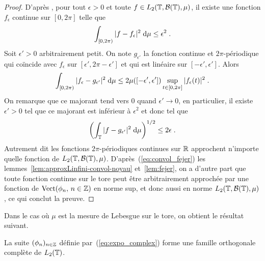 \begin{proof}
  D'apr\`{e}s \cite[proposition~8 du chapitre~6, page~128]{royden:1988}, pour tout
  $\epsilon>0$ et toute $f\in L_2(\mathbb{T},\mathcal{B}(\mathbb{T}),\mu)$, il existe une
  fonction $f_\epsilon$ continue sur $[0,2\pi]$ telle que
$$
\int_{[0,2\pi)}|f-f_\epsilon|^2\;\mathrm{d}\mu \leq \epsilon^2 \;.
$$
Soit $\epsilon'>0$ arbitrairement petit. On note $g_{\epsilon'}$ la fonction
continue et $2\pi$-p\'{e}riodique qui co\"{i}ncide avec $f_\epsilon$ sur
$[\epsilon',2\pi-\epsilon']$ et qui est lin\'{e}aire sur
$[-\epsilon',\epsilon']$. Alors
$$
\int_{[0,2\pi)}|f_\epsilon-g_{\epsilon'}|^2\;\mathrm{d}\mu \leq
2 \mu([-\epsilon',\epsilon']) \sup_{t\in[0,2\pi]}|f_\epsilon(t)|^2 \;.
$$
On remarque que ce majorant tend vers 0 quand $\epsilon'\to0$, en particulier,
il existe $\epsilon'>0$ tel que ce majorant est inf\'{e}rieur \`{a} $\epsilon^2$ et
donc tel que
$$
\left(\int_{\mathbb{T}}|f-g_{\epsilon'}|^2\;\mathrm{d}\mu\right)^{1/2} \leq 2\epsilon \;.
$$
Autrement dit les fonctions $2\pi$-p\'{e}riodiques continues sur $\mathbb{R}$ approchent
n'importe quelle fonction de $L_2(\mathbb{T},\mathcal{B}(\mathbb{T}),\mu)$.
D'apr\`{e}s~(\ref{eq:convol_fejer}) les lemmes~\ref{lem:approxLinfini-convol-noyau}
et~\ref{lem:fejer}, on a d'autre part que toute fonction continue sur le tore
peut \^{e}tre arbitrairement approch\'{e}e par une fonction de
$\mathrm{Vect}(\phi_n,\,n\in\mathbb{Z})$ en norme sup, et donc aussi en norme
$L_2(\mathbb{T},\mathcal{B}(\mathbb{T}),\mu)$, ce qui conclut la preuve.

\end{proof}


Dans le cas o\`{u} $\mu$ est la mesure de Lebesgue sur le tore, on obtient le
r\'{e}sultat suivant.
\begin{corollary}
\label{cor:completude-base-l2}
La suite $(\phi_n)_{n\in\mathbb{Z}}$ d\'{e}finie par~(\ref{eq:expo_complex})
forme une famille orthogonale compl\`{e}te de $L_2(\mathbb{T})$.
\end{corollary}

%

